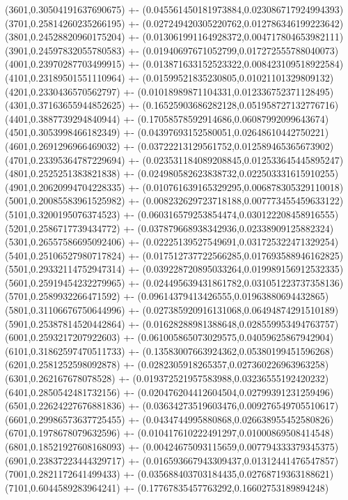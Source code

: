 {(3601,0.30504191637690675) +- (0.045561450181973884,0.023086717924994393)
(3701,0.25814260235266195) +- (0.027249420305220762,0.012786346199223642)
(3801,0.24528820960175204) +- (0.013061991164928372,0.004717804653982111)
(3901,0.24597832055780583) +- (0.01940697671052799,0.017272555788040073)
(4001,0.23970287703499915) +- (0.013871633152523322,0.008423109518922584)
(4101,0.23189501551110964) +- (0.01599521835230805,0.01021101329809132)
(4201,0.2330436570562797) +- (0.01018989871104331,0.012336752371128495)
(4301,0.37163655944852625) +- (0.16525903686282128,0.051958727132776716)
(4401,0.3887739294840944) +- (0.17058578592914686,0.06087992099643674)
(4501,0.3053998466182349) +- (0.04397693152580051,0.02648610442750221)
(4601,0.2691296966469032) +- (0.03722213129561752,0.012589465365673902)
(4701,0.23395364787229694) +- (0.023531184089208845,0.012533645445895247)
(4801,0.2525251383821838) +- (0.024980582623838732,0.022503331615910255)
(4901,0.20620994704228335) +- (0.010761639165329295,0.006878305329110018)
(5001,0.20085583961525982) +- (0.008232629723718188,0.007773455459633122)
(5101,0.3200195076374523) +- (0.060316579253854474,0.030122208458916555)
(5201,0.2586717739434772) +- (0.037879668938342936,0.02338909125882324)
(5301,0.26557586695092406) +- (0.02225139527549691,0.031725322471329254)
(5401,0.25106527980717824) +- (0.017512737722566285,0.017693588946162825)
(5501,0.29332114752947314) +- (0.039228720895033264,0.019989156912532335)
(5601,0.25919454232279965) +- (0.024495639431861782,0.031051223737358136)
(5701,0.2589932266471592) +- (0.09614379413426555,0.01963880694432865)
(5801,0.31106676750644996) +- (0.027385920916131068,0.06494874291510189)
(5901,0.25387814520442864) +- (0.01628288981388648,0.028559953494763757)
(6001,0.2593217207922603) +- (0.061005865073029575,0.04059625867942904)
(6101,0.31862597470511733) +- (0.13583007663924362,0.05380199451596268)
(6201,0.2581252598092878) +- (0.0282305918265357,0.027360226963963258)
(6301,0.262167678078528) +- (0.019372521957583988,0.03236555192420232)
(6401,0.2850542481732156) +- (0.020476204412604504,0.02799391231259496)
(6501,0.22624227676881836) +- (0.03634273519603476,0.009276549705510617)
(6601,0.29986573637725455) +- (0.0434744995880868,0.026638955452580826)
(6701,0.1978678079632596) +- (0.010417610222491297,0.01000869508414548)
(6801,0.18521927608168093) +- (0.00424675093115659,0.007794333379345375)
(6901,0.23837223444329717) +- (0.016593667943309437,0.01312441476547857)
(7001,0.2821172641499433) +- (0.035688403703184435,0.02768719363188621)
(7101,0.6044589283964241) +- (0.17767835457763292,0.16602753189894248)
}
